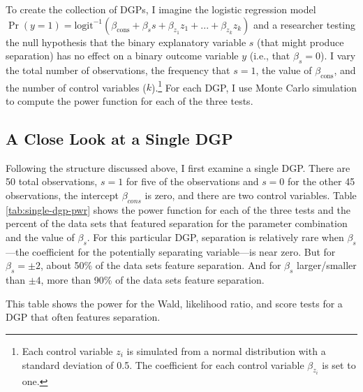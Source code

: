 \documentclass[
]{article}
\begin{document}
To create the collection of DGPs, I imagine the logistic regression
model
\(\Pr(y = 1) = \text{logit}^{-1}(\beta_{\text{cons}} + \beta_s s + \beta_{z_1} z_1 + ... + \beta_{z_k} z_k)\)
and a researcher testing the null hypothesis that the binary explanatory
variable \(s\) (that might produce separation) has no effect on a binary
outcome variable \(y\) (i.e., that \(\beta_s = 0\)). I vary the total
number of observations, the frequency that \(s = 1\), the value of
\(\beta_{\text{cons}}\), and the number of control variables
(\(k\)).\footnote{Each control variable \(z_i\) is simulated from a
  normal distribution with a standard deviation of 0.5. The coefficient
  for each control variable \(\beta_{z_i}\) is set to one.} For each
DGP, I use Monte Carlo simulation to compute the power function for each
of the three tests.

\hypertarget{a-close-look-at-a-single-dgp}{%
\subsection{A Close Look at a Single
DGP}\label{a-close-look-at-a-single-dgp}}

Following the structure discussed above, I first examine a single DGP.
There are 50 total observations, \(s = 1\) for five of the observations
and \(s = 0\) for the other 45 observations, the intercept
\(\beta_{cons}\) is zero, and there are two control variables. Table
\ref{tab:single-dgp-pwr} shows the power function for each of the three
tests and the percent of the data sets that featured separation for the
parameter combination and the value of \(\beta_s\). For this particular
DGP, separation is relatively rare when \(\beta_s\)---the coefficient
for the potentially separating variable---is near zero. But for
\(\beta_s = \pm 2\), about 50\% of the data sets feature separation. And
for \(\beta_s\) larger/smaller than \(\pm 4\), more than 90\% of the
data sets feature separation.

\renewcommand{\captiontext}{}
\renewcommand{\notetext}{This table shows the power for the Wald, likelihood ratio, and score tests for a DGP that often features separation.}
\begin{table}[!h]
\caption{\label{tab:single-dgp-pwr}}
\centering
\fontsize{8}{9}\selectfont
\begin{threeparttable}
   
\begin{tablenotes}[para]
This table shows the power for the Wald, likelihood ratio, and score tests for a DGP that often features separation.
\end{tablenotes}
\end{threeparttable}
\end{table}
\end{document}
